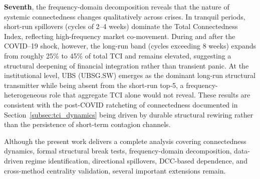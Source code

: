 \textbf{Seventh}, the frequency-domain decomposition \citep{BarunikKrehlik2018} reveals
that the nature of systemic connectedness changes qualitatively across crises. In tranquil
periods, short-run spillovers (cycles of 2--4 weeks) dominate the Total Connectedness
Index, reflecting high-frequency market co-movement. During and after the COVID--19 shock,
however, the long-run band (cycles exceeding 8 weeks) expands from roughly 25\% to 45\%
of total TCI and remains elevated, suggesting a structural deepening of financial
integration rather than transient panic. At the institutional level, UBS (UBSG.SW) emerges
as the dominant long-run structural transmitter while being absent from the short-run
top-5, a frequency-heterogeneous role that aggregate TCI alone would not reveal. These
results are consistent with the post-COVID ratcheting of connectedness documented
in Section~\ref{subsec:tci_dynamics} being driven by durable structural rewiring rather than
the persistence of short-term contagion channels.



Although the present work delivers a complete analysis covering connectedness dynamics,
formal structural break tests, frequency-domain decomposition, data-driven regime
identification, directional spillovers, DCC-based dependence, and cross-method centrality
validation, several important extensions remain.

